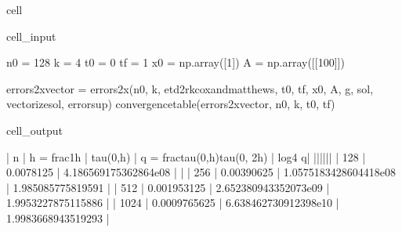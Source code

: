 \documentclass[letterpaper,10pt,english]{jupyterBook}
\begin{document}
\begin{sphinxuseclass}{cell}\begin{sphinxVerbatimInput}

\begin{sphinxuseclass}{cell_input}
\begin{sphinxVerbatim}[commandchars=\\\{\}]
n0 = 128
k = 4
t0 = 0
tf = 1
x0 = np.array([1])
A = np.array([[100]])

errors\PYGZus{}2x\PYGZus{}vector = errors\PYGZus{}2x(n0, k, etd2rk\PYGZus{}cox\PYGZus{}and\PYGZus{}matthews, t0, tf, x0, A, g, sol, vectorize\PYGZus{}sol, error\PYGZus{}sup)
convergence\PYGZus{}table(errors\PYGZus{}2x\PYGZus{}vector, n0, k, t0, tf)
\end{sphinxVerbatim}

\end{sphinxuseclass}\end{sphinxVerbatimInput}
\begin{sphinxVerbatimOutput}

\begin{sphinxuseclass}{cell_output}
\begin{sphinxVerbatim}[commandchars=\\\{\}]
| n | h = \PYGZdl{}\PYGZbs{}frac\PYGZob{}1\PYGZcb{}\PYGZob{}h\PYGZcb{}\PYGZdl{} | \PYGZdl{}\PYGZbs{}tau(0,h)\PYGZdl{} | q = \PYGZdl{}\PYGZbs{}frac\PYGZob{}tau(0,h)\PYGZcb{}\PYGZob{}tau(0, 2h)\PYGZcb{}\PYGZdl{} | \PYGZdl{}log\PYGZus{}4 \PYGZca{}q\PYGZdl{}|
|\PYGZhy{}\PYGZhy{}\PYGZhy{}|\PYGZhy{}\PYGZhy{}\PYGZhy{}\PYGZhy{}\PYGZhy{}\PYGZhy{}\PYGZhy{}\PYGZhy{}\PYGZhy{}\PYGZhy{}\PYGZhy{}\PYGZhy{}\PYGZhy{}\PYGZhy{}\PYGZhy{}\PYGZhy{}\PYGZhy{}|\PYGZhy{}\PYGZhy{}\PYGZhy{}\PYGZhy{}\PYGZhy{}\PYGZhy{}\PYGZhy{}\PYGZhy{}\PYGZhy{}\PYGZhy{}\PYGZhy{}|\PYGZhy{}\PYGZhy{}\PYGZhy{}\PYGZhy{}\PYGZhy{}\PYGZhy{}\PYGZhy{}\PYGZhy{}\PYGZhy{}\PYGZhy{}\PYGZhy{}\PYGZhy{}\PYGZhy{}\PYGZhy{}\PYGZhy{}\PYGZhy{}\PYGZhy{}\PYGZhy{}\PYGZhy{}\PYGZhy{}\PYGZhy{}\PYGZhy{}\PYGZhy{}\PYGZhy{}\PYGZhy{}\PYGZhy{}\PYGZhy{}\PYGZhy{}\PYGZhy{}\PYGZhy{}\PYGZhy{}\PYGZhy{}\PYGZhy{}|\PYGZhy{}\PYGZhy{}\PYGZhy{}\PYGZhy{}\PYGZhy{}\PYGZhy{}\PYGZhy{}|
 | 128 | 0.0078125 | 4.186569175362864e\PYGZhy{}08 | \PYGZhy{} | 
 | 256 | 0.00390625 | 1.0575183428604418e\PYGZhy{}08 | 1.985085775819591 | 
 | 512 | 0.001953125 | 2.652380943352073e\PYGZhy{}09 | 1.9953227875115886 | 
 | 1024 | 0.0009765625 | 6.638462730912398e\PYGZhy{}10 | 1.9983668943519293 | 
\end{sphinxVerbatim}

\end{sphinxuseclass}\end{sphinxVerbatimOutput}

\end{sphinxuseclass}
\end{document}
